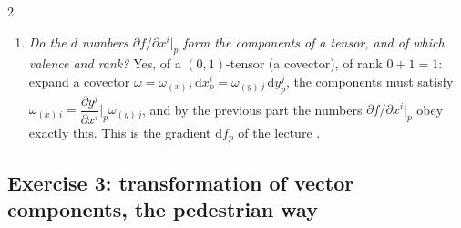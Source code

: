 \begin{paracol}{2}
\begin{enumerate}
  \item \emph{Do the $d$ numbers $\partial f/\partial x^i|_p$ form the components of a tensor, and of which valence and rank?} Yes, of a $(0,1)$-tensor (a covector), of rank $0+1=1$: expand a covector $\omega=\omega_{(x)\,i}\,\mathrm dx^i_p=\omega_{(y)\,j}\,\mathrm dy^j_p$, the components must satisfy $\omega_{(x)\,i}=\dfrac{\partial y^j}{\partial x^i}\Big|_p\omega_{(y)\,j}$, and
        by the previous part the numbers $\partial f/\partial x^i|_p$ obey exactly this. This is the gradient $\mathrm df_p$ of the lecture .
\end{enumerate}

\subsection*{Exercise 3: transformation of vector components, the pedestrian way}


\end{paracol}
